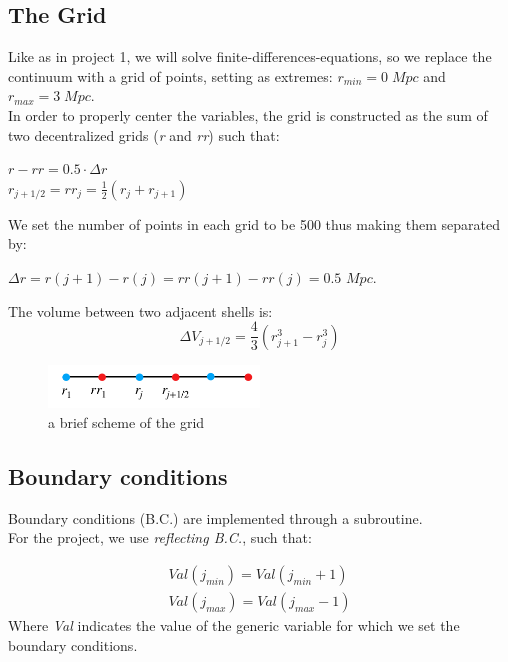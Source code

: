 \documentclass{article}
\begin{document}
\subsection{The Grid}
Like as in project 1, we will solve finite-differences-equations, so we replace the continuum with a grid of points, setting as extremes: \(r_{min}=0\;Mpc\) and \(r_{max}=3\;Mpc\). \\ 
In order to properly center the variables, the grid is constructed as the sum of two decentralized grids (\textit{r} and \textit{rr}) such that:

\begin{center}

$r-rr = 0.5 \cdot \Delta r$ \\
${r}_{j+1/2}=rr_{j}=\frac{1}{2}(r_j+r_{j+1})$
\end{center}


We set the number of points in each grid to be 500 thus making them separated by:

\begin{center}
$\Delta r = r(j+1)-r(j)= rr(j+1) - rr(j) = 0.5 $ $Mpc$. 
\end {center}

The volume between two adjacent shells is:
\begin{equation}
	{\Delta V}_{j+1/2}=\frac{4}{3}(r_{j+1}^{3}-r_j^{3})
\end{equation}


\begin{figure}[h!]
\centering
\includegraphics[width=0.5\textwidth]{griglia}
\caption{a brief scheme of the grid}
\label{fig:griglia}
\end{figure}

\newpage
\subsection{Boundary conditions}

Boundary conditions (B.C.) are implemented through a subroutine.\\
For the project, we use \textit{reflecting B.C.}, such that:

\begin{align*}
    Val(j_{min}) = Val(j_{min}+1) \\
    Val(j_{max}) = Val(j_{max}-1)
\end{align*}
Where \textit{Val} indicates the value of the generic variable for which we set the boundary conditions.
\end{document}
